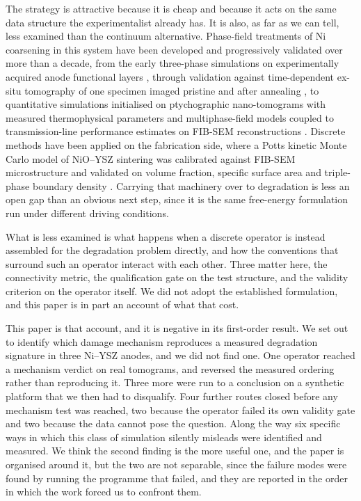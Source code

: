 \documentclass[5p,times,twocolumn]{elsarticle}
\begin{document}
The strategy is attractive because it is cheap and because it acts on the same
data structure the experimentalist already has. It is also, as far as we can
tell, less examined than the continuum alternative. Phase-field treatments of
Ni coarsening in this system have been developed and progressively validated
over more than a decade, from the early three-phase simulations on
experimentally acquired anode functional layers \cite{chen2011}, through
validation against time-dependent ex-situ tomography of one specimen imaged
pristine and after annealing \cite{trini2021}, to
quantitative simulations initialised on ptychographic
nano-tomograms with measured thermophysical parameters \cite{yang2023} and
multiphase-field models coupled to transmission-line performance estimates on
FIB-SEM reconstructions \cite{hoffrogge2023}. Discrete methods have been
applied on the fabrication side, where a Potts kinetic Monte Carlo model of
NiO--YSZ sintering was calibrated against FIB-SEM microstructure and validated
on volume fraction, specific surface area and triple-phase boundary density
\cite{zhou2023}. Carrying that machinery over to degradation is less an open
gap than an obvious next step, since it is the same free-energy formulation
run under different driving conditions.

What is less examined is what happens when a discrete operator is instead
assembled for the degradation problem directly, and how the conventions that
surround such an operator interact with each other. Three matter here, the
connectivity metric, the qualification gate on the test structure, and the
validity criterion on the operator itself. We did not adopt the established formulation, and this
paper is in part an account of what that cost.

This paper is that account, and it is negative in its first-order result. We
set out to identify which damage mechanism reproduces a measured degradation
signature in three Ni--YSZ anodes, and we did not find one. One operator
reached a mechanism verdict on real tomograms, and reversed the measured
ordering rather than reproducing it. Three more were run to a conclusion on a
synthetic platform that we then had to disqualify. Four further routes closed
before any mechanism test was reached, two because the operator failed its own
validity gate and two because the data cannot pose the question. Along the way
six specific ways in which this class of simulation
silently misleads were identified and measured. We think the second finding is
the more useful one, and the paper is organised around it, but the two are not
separable, since the failure modes were found by running the programme that
failed, and they are reported in the order in which the work forced us to
confront them.
\end{document}
